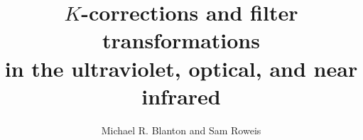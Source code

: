 \documentclass[12pt,preprint]{aastex}
\begin{document}
 
\title{$K$-corrections and filter transformations \\
in the ultraviolet, optical, and near infrared}

\author{
Michael R. Blanton\altaffilmark{\ref{NYU}} and 
Sam Roweis\altaffilmark{\ref{UToronto}}
}
\end{document}
